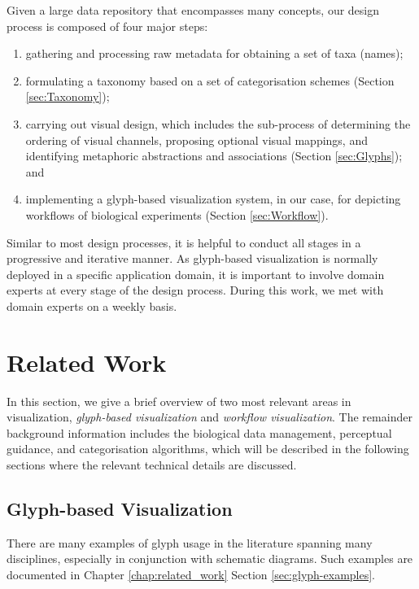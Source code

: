 Given a large data repository that encompasses many concepts, our design process is composed of four major steps:
\begin{enumerate}
\item gathering and processing raw metadata for obtaining a set of taxa (names);
\item formulating a taxonomy based on a set of categorisation schemes (Section \ref{sec:Taxonomy});
\item carrying out visual design, which includes the sub-process of determining the ordering of visual channels, proposing optional visual mappings, and identifying metaphoric abstractions and associations (Section \ref{sec:Glyphs}); and
\item implementing a glyph-based visualization system, in our case, for depicting workflows of biological experiments (Section \ref{sec:Workflow}).
\end{enumerate}

Similar to most design processes, it is helpful to conduct all stages in a progressive and iterative manner.
As glyph-based visualization is normally deployed in a specific application domain, it is important to involve domain experts at every stage of the design process.
During this work, we met with domain experts on a weekly basis.

\section{Related Work}
\label{sec:RelatedWork}
In this section, we give a brief overview of two most relevant areas in visualization, \emph{glyph-based visualization} and \emph{workflow visualization}.
The remainder background information includes the biological data management, perceptual guidance, and categorisation algorithms, which will be described in the following sections where the relevant technical details are discussed.

\subsection{Glyph-based Visualization}
%
There are many examples of glyph usage in the literature spanning many disciplines, especially in conjunction with schematic diagrams. Such examples are  documented in Chapter \ref{chap:related_work} Section \ref{sec:glyph-examples}. 

